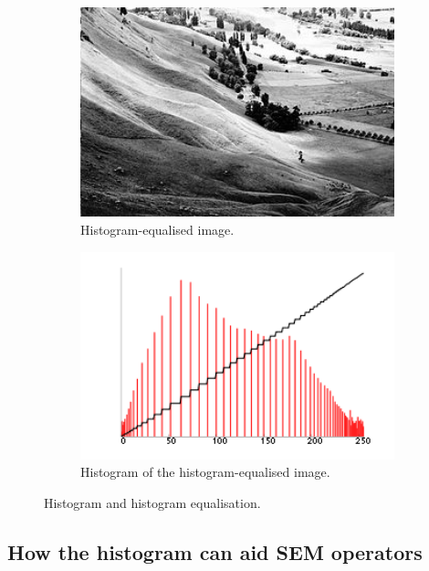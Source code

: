 \documentclass[12pt, twocolumn]{report}
\begin{document}
\begin{figure}[htbp]
\begin{subfigure}{0.4\textwidth}
        \includegraphics[width=1\textwidth]{Figures/Histogram equalisation final image.jpg}
        \caption{Histogram-equalised image.}
        \label{Histogram equalisation final image}
    \end{subfigure}
    \begin{subfigure}{0.4\textwidth}
        \centering
        \includegraphics[width=1\textwidth]{Figures/Histogram equalisation final image histogram.png}
        \caption{Histogram of the histogram-equalised image.}
        \label{Histogram equalisation final image histogram}
    \end{subfigure}
    \caption{Histogram and histogram equalisation.}
    \label{Histogram and histogram equalisation}
\end{figure}

\subsection{How the histogram can aid SEM operators}
\end{document}
